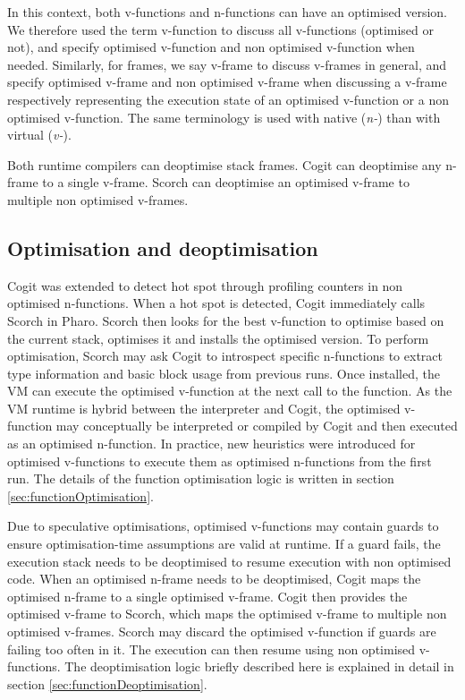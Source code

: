 \documentclass[a4paper,12pt,twoside]{../includes/ThesisStyle}
\begin{document}
In this context, both v-functions and n-functions can have an optimised version. We therefore used the term v-function to discuss all v-functions (optimised or not), and specify optimised v-function and non optimised v-function when needed. Similarly, for frames, we say v-frame to discuss v-frames in general, and specify optimised v-frame and non optimised v-frame when discussing a v-frame respectively representing the execution state of an optimised v-function or a non optimised v-function. The same terminology is used with native (\emph{n-}) than with virtual (\emph{v-}).

Both runtime compilers can deoptimise stack frames. Cogit can deoptimise any n-frame to a single v-frame. 
Scorch can deoptimise an optimised v-frame to multiple non optimised v-frames. 

\subsection{Optimisation and deoptimisation}
\label{sec:further}

Cogit was extended to detect hot spot through profiling counters in non optimised n-functions. When a hot spot is detected, Cogit immediately calls Scorch in Pharo. Scorch then looks for the best v-function to optimise based on the current stack, optimises it and installs the optimised version. To perform optimisation, Scorch may ask Cogit to introspect specific n-functions to extract type information and basic block usage from previous runs. Once installed, the VM can execute the optimised v-function at the next call to the function. As the VM runtime is hybrid between the interpreter and Cogit, the optimised v-function may conceptually be interpreted or compiled by Cogit and then executed as an optimised n-function. In practice, new heuristics were introduced for optimised v-functions to execute them as optimised n-functions from the first run. The details of the function optimisation logic is written in section \ref{sec:functionOptimisation}.

Due to speculative optimisations, optimised v-functions may contain guards to ensure optimisation-time assumptions are valid at runtime. If a guard fails, the execution stack needs to be deoptimised to resume execution with non optimised code. When an optimised n-frame needs to be deoptimised, Cogit maps the optimised n-frame to a single optimised v-frame. Cogit then provides the optimised v-frame to Scorch, which maps the optimised v-frame to multiple non optimised v-frames. Scorch may discard the optimised v-function if guards are failing too often in it. The execution can then resume using non optimised v-functions. The deoptimisation logic briefly described here is explained in detail in section \ref{sec:functionDeoptimisation}.
\end{document}
